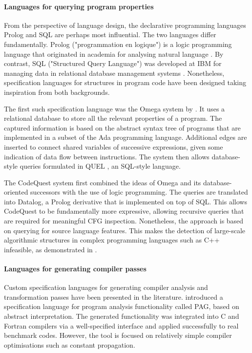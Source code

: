     \paragraph*{Languages for querying program properties}
    From the perspective of language design, the declarative programming
    languages Prolog and SQL are perhaps most influential.
    The two languages differ fundamentally.
    Prolog ("programmation en logique") is a logic programming language that
    originated in academia for analysing natural language
    \citep{Colmerauer:1993:BP:154766.155362}.
    By contrast, SQL ("Structured Query Language") was developed at IBM for
    managing data in relational database management systems
    \citep{Chamberlin:1974:SSE:800296.811515}.
    Nonetheless, specification languages for structures in program code have
    been designed taking inspiration from both backgrounds.

    The first such specification language was the Omega system by
    \citet{Linton:CSD-83-164}.
    It uses a relational database to store all the relevant properties of a
    program.
    The captured information is based on the abstract syntax tree of programs
    that are implemented in a subset of the Ada programming language.
    Additional edges are inserted to connect shared variables of
    successive expressions, given some indication of data flow between
    instructions.
    The system then allows database-style queries formulated in QUEL
    \citep{Stonebraker:1976:DII:320473.320476}, an SQL-style language.

    The CodeQuest system \citep{Hajiyev:2006:CSS:2171327.2171331} first combined
    the ideas of Omega and its database-oriented successors with the use
    of logic programming.
    The queries are translated into Datalog, a Prolog derivative that is
    implemented on top of SQL.
    This allows CodeQuest to be fundamentally more expressive, allowing
    recursive queries that are required for meaningful CFG inspection.
    Nonetheless, the approach is based on querying for source language features.
    This makes the detection of large-scale algorithmic structures in complex
    programming languages such as C++ infeasible, as demonstrated in
    .

    \paragraph*{Languages for generating compiler passes}
    Custom specification languages for generating compiler analysis and
    transformation passes have been presented in the literature.
    \citet{Martin1998} introduced a specification language for program analysis
    functionality called PAG, based on abstract interpretation.
    The generated functionality was integrated into C and Fortran compilers via
    a well-specified interface and applied successfully to real benchmark codes.
    However, the tool is focused on relatively simple compiler optimisations
    such as constant propagation.

